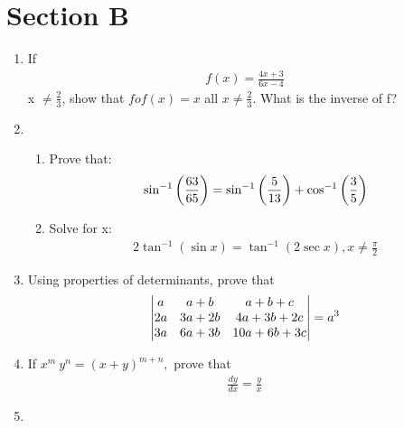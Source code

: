 \documentclass[journal,12pt,twocolumn]{IEEEtran}
\renewcommand\thesection{\arabic{section}}
\begin{document}
\section{Section B}
\renewcommand{\theequation}{\theenumi}
\begin{enumerate}[label=\thesection.\arabic*.,ref=\thesection.\theenumi]
\item If  
\begin{align}
f(x) = \frac{4x+3}{6x-4} \nonumber
\end{align}
 x $\neq \frac{2}{3}$, show that $fof(x) = x$ all $x \neq \frac{2}{3}$. What is the inverse of f? \\
\item \begin{enumerate}
\item Prove that: \\
\begin{align}
    \sin^{-1}\left(\frac{63}{65}\right)=\sin^{-1}\left(\frac{5}{13}\right)+\cos^{-1}\left(\frac{3}{5}\right) \nonumber
\end{align}
\item Solve for x:\\
\begin{align}
    2 \tan^{-1}(\sin x)=\tan^{-1}(2 \sec x), x \neq \frac{\pi}{2} \nonumber
\end{align}
\end{enumerate}
\item Using properties of determinants, prove that\\ 
\begin{align}
\begin{vmatrix} a & a+b & a+b+c \\ 2a & 3a+2b & 4a+3b+2c \\ 3a & 6a+3b & 10a+6b+3c\end{vmatrix} = a^{3} \nonumber
\end{align}
\item If $x^{m} \ y^{n}=(x+y)^{m+n},$ prove that 
\begin{align}
\frac{dy}{dx}=\frac{y}{x}    \nonumber
\end{align}
\item \begin{enumerate}
    

\end{enumerate}
\end{enumerate}
\end{document}
